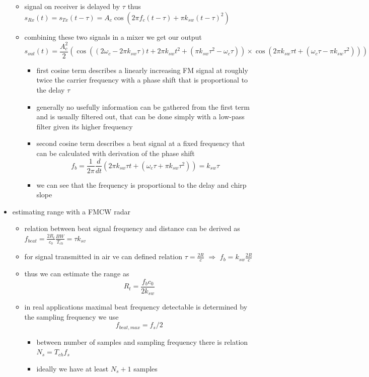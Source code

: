 \documentclass[a4paper,12pt]{report}
\begin{document}
\begin{itemize}
\begin{itemize}
			\item signal on receiver is delayed by $\tau$ thus $s_{Rx}(t) = s_{Tx}(t-\tau) = A_c \cos(2\pi f_c (t-\tau) + \pi k_{sw} (t-\tau)^2)$
			\item combining these two signals in a mixer we get our output
				\[
					s_{out}(t) = \frac{A_c^2}{2} (\cos((2\omega_c - 2\pi k_{sw}\tau )t + 2\pi k_{sw}t^2 + (\pi k_{sw} \tau^2 - \omega_c\tau)) \times \cos(2\pi k_{sw} \tau t + (\omega_c \tau - \pi k_{sw} \tau^2) ))
				\]
				\begin{itemize}
					\item first cosine term describes a linearly increasing FM signal at roughly twice the carrier frequency  with a phase shift that is proportional to the delay $\tau$
					\item generally no usefully information can be gathered from the first term and is usually filtered out, that can be done simply with a low-pass filter given its higher frequency
					\item second cosine term describes a beat signal at a fixed frequency that can be calculated with derivation of the phase shift
						\[
							f_b = \frac{1}{2\pi} \frac{d }{d t} (2\pi k_{sw}\tau t + (\omega_c \tau + \pi k_{sw} \tau^2)) = k_{sw}\tau
						\]
					\item we can see that the frequency is proportional to the delay and chirp slope
				\end{itemize}
		\end{itemize}
	\item estimating range with a FMCW radar
		\begin{itemize}
			\item relation between beat signal frequency and distance can be derived as $f_{beat} = \frac{2R_t}{c_0} \frac{BW}{T_{ch}} = \tau k_{sv}$
			\item for signal transmitted in air ve can defined relation $\tau = \frac{2R}{c}$ $\Rightarrow$ $f_b = k_{sw} \frac{2R}{c} $
			\item thus we can estimate the range as
				\[
					R_t = \frac{f_b c_0}{2k_{sw}}
				\]
			\item in real applications maximal beat frequency detectable is determined by the sampling frequency we use
				\[
					f_{beat, max} = f_{s}/2
				\]
				\begin{itemize}
					\item between number of samples and sampling frequency there is relation $N_s = T_{ch} f_s$
					\item ideally we have at least $N_s+1$ samples

\end{itemize}
\end{itemize}
\end{itemize}
\end{document}
